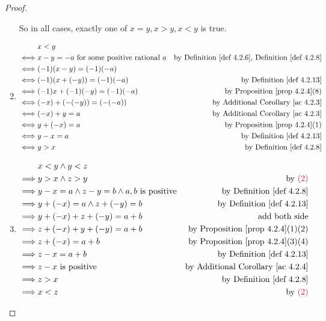 \begin{proof}
\begin{enumerate}
\begin{itemize}
        \end{itemize}
        So in all cases, exactly one of \(x = y, x > y, x < y\) is true.
    \item {}
        \begin{align*}
                 & x < y \\
            \iff & x - y = -a \text{\ for some positive rational \(a\)} & \text{by \DEF{4.2.6}, \DEF{4.2.8}} \\
            \iff & (-1)(x - y) = (-1)(-a) \\
            \iff & (-1)(x + (-y)) = (-1)(-a) & \text{by \DEF{4.2.13}} \\
            \iff & (-1)x + (-1)(-y) = (-1)(-a) & \text{by \PROP{4.2.4}(8)} \\
            \iff & (-x) + (-(-y)) = (-(-a)) & \text{by \AC{4.2.3}} \\
            \iff & (-x) + y = a & \text{by \AC{4.2.3}} \\
            \iff & y + (-x) = a & \text{by \PROP{4.2.4}(1)} \\
            \iff & y - x = a & \text{by \DEF{4.2.13}} \\
            \iff & y > x & \text{by \DEF{4.2.8}}
        \end{align*}
    \item {}
        \begin{align*}
                     & x < y \land y < z \\
            \implies & y > x \land z > y & \text{by \MAROON{(2)}} \\
            \implies & y - x = a \land z - y = b \land a, b \text{ is positive} & \text{by \DEF{4.2.8}} \\
            \implies & y + (-x) = a \land z + (-y) = b & \text{by \DEF{4.2.13}} \\
            \implies & y + (-x) + z + (-y) = a + b & \text{add both side} \\
            \implies & z + (-x) + y + (-y) = a + b & \text{by \PROP{4.2.4}(1)(2)} \\
            \implies & z + (-x) = a + b & \text{by \PROP{4.2.4}(3)(4)} \\
            \implies & z - x = a + b & \text{by \DEF{4.2.13}} \\
            \implies & z - x \text{\ is positive} & \text{by \AC{4.2.4}} \\
            \implies & z > x & \text{by \DEF{4.2.8}} \\
            \implies & x < z & \text{by \MAROON{(2)}}

\end{align*}
\end{enumerate}
\end{proof}
